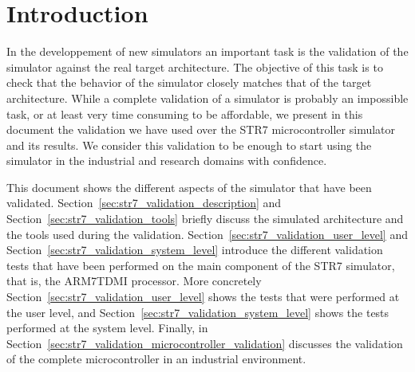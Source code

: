\section{Introduction}
\label{sec:str7_validation_introduction}

In the developpement of new simulators an important task is the validation of the simulator against the real target architecture.
The objective of this task is to check that the behavior of the simulator closely matches that of the target architecture. 
While a complete validation of a simulator is probably an impossible task, or at least very time consuming to be affordable, we present in this document the validation we have used over the STR7 microcontroller simulator and its results. 
We consider this validation to be enough to start using the simulator in the industrial and research domains with confidence.

This document shows the different aspects of the simulator that have been validated.
Section~\ref{sec:str7_validation_description} and Section~\ref{sec:str7_validation_tools} briefly discuss the simulated architecture and the tools used during the validation.
Section~\ref{sec:str7_validation_user_level} and Section~\ref{sec:str7_validation_system_level} introduce the different validation tests that have been performed on the main component of the STR7 simulator, that is, the ARM7TDMI processor.
More concretely Section~\ref{sec:str7_validation_user_level} shows the tests that were performed at the user level, and Section~\ref{sec:str7_validation_system_level} shows the tests performed at the system level.
Finally, in Section~\ref{sec:str7_validation_microcontroller_validation} discusses the validation of the complete microcontroller in an industrial environment.

